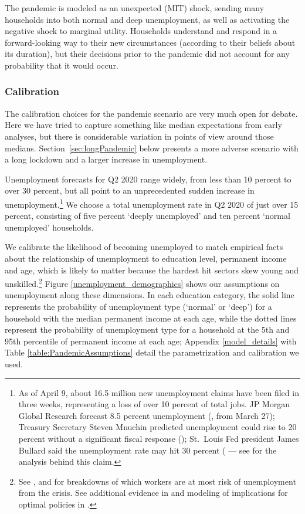 \documentclass[titlepage]{\econtex}
\begin{document}
The pandemic is modeled as an unexpected (MIT) shock, sending many households into both normal and deep unemployment, as well as activating the negative shock to marginal utility. Households understand and respond in a forward-looking way to their new circumstances (according to their beliefs about its duration), but their decisions prior to the pandemic did not account for any probability that it would occur.

\subsubsection{Calibration}
The calibration choices for the pandemic scenario are very much open for debate. Here we have tried to capture something like median expectations from early analyses, but there is considerable variation in points of view around those medians. 
Section~\ref{sec:longPandemic} below presents a more adverse scenario with a long lockdown and a larger increase in unemployment.

Unemployment forecasts for Q2 2020 range widely, from less than 10 percent to over 30 percent, but all point to an unprecedented sudden increase in unemployment.\footnote{As of April 9, about 16.5 million new unemployment claims have been filed in three weeks, representing a loss of over 10 percent  of total jobs.  JP Morgan Global Research forecast 8.5 percent unemployment (\cite{JPMorganBlog2020}, from March 27); Treasury Secretary Steven Mnuchin predicted unemployment could rise to 20 percent without a significant fiscal response (\cite{Bloomberg1}); St.\ Louis Fed president James Bullard said the unemployment rate may hit 30 percent  (\cite{Bloomberg2} --- see \cite{FariaBlog2020} for the analysis behind this claim.}
We choose a total unemployment rate in Q2 2020 of just over 15 percent, consisting of five percent `deeply unemployed' and ten percent `normal unemployed' households.

We calibrate the likelihood of becoming unemployed to match empirical facts about the relationship of unemployment to education level, permanent income and age, which is likely to matter because the hardest hit sectors skew young and unskilled.\footnote{See \cite{GasconCOVID2020}, \cite{LeiboviciSocial2020} and \cite{covid_USsurvey} for breakdowns of which workers are at most risk of unemployment from the crisis.
  See additional evidence in \cite{kmv_pandemics} and modeling of implications for optimal policies in \cite{healthWealth}.}
Figure \ref{unemployment_demographics} shows our assumptions on unemployment along these dimensions.
In each education category, the solid line represents the probability of unemployment type (`normal' or `deep') for a household with the median permanent income at each age, while the dotted lines represent the probability of unemployment type for a household at the 5th and 95th percentile of permanent income at each age; Appendix \ref{model_details} with Table \ref{table:PandemicAssumptions} detail the parametrization and calibration we used.
\end{document}
